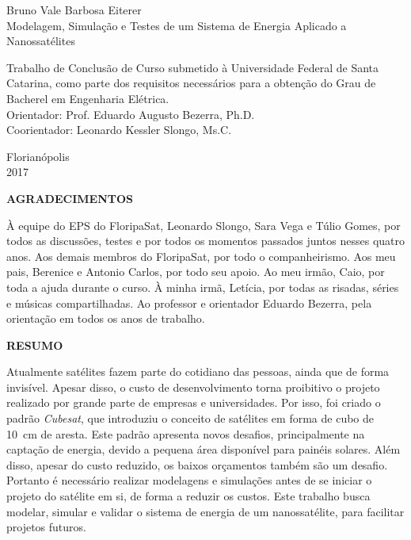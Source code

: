 \documentclass[a5paper, oldfontcommands, hidelinks]{ufsc-thesis}  %
\begin{document}
\pretextual%
\imprimircapa%
\begin{center}
Bruno Vale Barbosa Eiterer \\
\vspace{\fill}
\Large{Modelagem, Simulação e Testes de um Sistema de Energia Aplicado a Nanossatélites} \\
\vspace{\fill}
\end{center}
\hfill
\begin{minipage}{0.5\textwidth}
\raggedright \small Trabalho de Conclusão de Curso submetido à Universidade Federal de Santa Catarina, como parte dos requisitos necessários para a obtenção do Grau de Bacherel em Engenharia Elétrica. \\
Orientador: Prof. Eduardo Augusto Bezerra, Ph.D. \\
Coorientador: Leonardo Kessler Slongo, Ms.C.
\end{minipage}
\vfill
\begin{center}
Florianópolis \\
2017
\end{center}


\clearpage
\imprimirfichacatalografica%
\textual%

\clearpage
\begin{center}
\large\textbf{AGRADECIMENTOS}
\end{center}
À equipe do EPS do FloripaSat, Leonardo Slongo, Sara Vega e Túlio Gomes, por todos as discussões, testes e por todos os momentos passados juntos nesses quatro anos. Aos demais membros do FloripaSat, por todo o companheirismo. Aos meu pais, Berenice e Antonio Carlos, por todo seu apoio. Ao meu irmão, Caio, por toda a ajuda durante o curso. À minha irmã, Letícia, por todas as risadas, séries e músicas compartilhadas. Ao professor e orientador Eduardo Bezerra, pela orientação em todos os anos de trabalho. 

\clearpage
\begin{center}
\large\textbf{RESUMO}
\end{center}
Atualmente satélites fazem parte do cotidiano das pessoas, ainda que de forma invisível. Apesar disso, o custo de desenvolvimento torna proibitivo o projeto realizado por grande parte de empresas e universidades. Por isso, foi criado o padrão \textit{Cubesat}, que introduziu o conceito de satélites em forma de cubo de \SI{10}{\centi\metre} de aresta. Este padrão apresenta novos desafios, principalmente na captação de energia, devido a pequena área disponível para painéis solares. Além disso, apesar do custo reduzido, os baixos orçamentos também são um desafio. Portanto é necessário realizar modelagens e simulações antes de se iniciar o projeto do satélite em si, de forma a reduzir os custos. Este trabalho busca modelar, simular e validar o sistema de energia de um nanossatélite, para facilitar projetos futuros.
\end{document}
